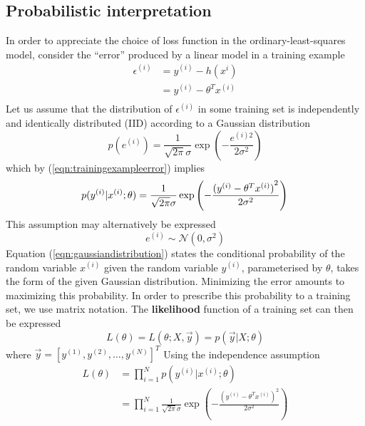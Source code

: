 \documentclass{article}
\theoremstyle{definition}
\theoremstyle{remark}
\begin{document}
\subsection{Probabilistic interpretation}
In order to appreciate the choice of loss function in the ordinary-least-squares model, consider the ``error'' produced by a linear model in a training example
\begin{align}
    \label{eqn:trainingexampleerror}
    \epsilon^{(i)} &= y^{(i)} - h(x^{i}) \nonumber\\
                &= y^{(i)} - \theta^{T}x^{(i)} \\ \nonumber
\end{align}
Let us assume that the distribution of $\epsilon^{(i)}$ in some training set is independently and identically distributed (IID) according to a Gaussian distribution
\begin{equation}
    p(e^{(i)}) = \frac{1}{\sqrt{2\pi}\sigma}\exp\left(-\frac{e^{(i)2}}{2\sigma^{2}}\right)
\end{equation}
which by (\ref{eqn:trainingexampleerror}) implies
\begin{equation}
    \label{eqn:gaussiandistribution}
    p{(y^{(i)}|x^{(i)}; \theta)} = \frac{1}{\sqrt{2\pi}\sigma}\exp\left(-\frac{{(y^{(i)} - \theta^{T}x^{(i)})}^{2}}{2\sigma^{2}}\right) \\
\end{equation}
This assumption may alternatively be expressed 
\begin{equation}
    e^{(i)} \sim \mathcal{N}(0, \sigma^{2})
\end{equation}
Equation (\ref{eqn:gaussiandistribution}) states the conditional probability of the random variable $x^{(i)}$ given the random variable $y^{(i)}$, parameterised by $\theta$, takes the form of the given Gaussian distribution.
Minimizing the error amounts to maximizing this probability.
In order to prescribe this probability to a training set, we use matrix notation.
The \textbf{likelihood} function of a training set can then be expressed
\begin{equation}
    L(\theta) = L(\theta; X, \vec{y}) = p (\vec{y}|X;\theta)
\end{equation}
where $\vec{y} = {[y^{(1)}, y^{(2)}, \dots, y^{(N)}]}^{T}$
Using the independence assumption
\begin{align}
    L(\theta) &= \prod_{i=1}^{N}p(y^{(i)}|x^{(i)}; \theta) \nonumber \\
    &= \prod_{i=1}^{N} \frac{1}{\sqrt{2\pi}\sigma}\exp\left(-\frac{{(y^{(i)} - \theta^{T}x^{(i)})}^{2}}{2\sigma^{2}}\right) 
\end{align}
\end{document}
